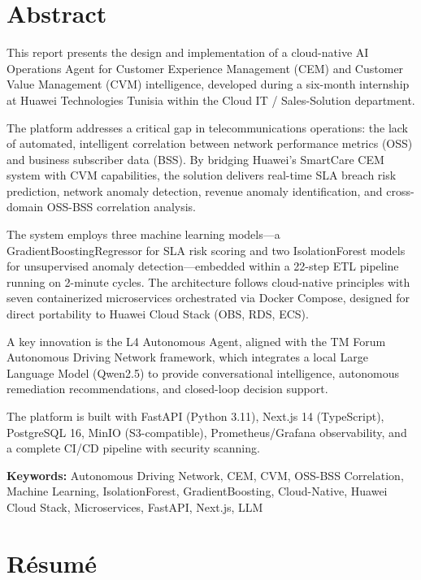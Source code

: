 \chapter*{Abstract}

This report presents the design and implementation of a cloud-native AI Operations Agent for Customer Experience Management (CEM) and Customer Value Management (CVM) intelligence, developed during a six-month internship at Huawei Technologies Tunisia within the Cloud IT / Sales-Solution department.

The platform addresses a critical gap in telecommunications operations: the lack of automated, intelligent correlation between network performance metrics (OSS) and business subscriber data (BSS). By bridging Huawei's SmartCare CEM system with CVM capabilities, the solution delivers real-time SLA breach risk prediction, network anomaly detection, revenue anomaly identification, and cross-domain OSS-BSS correlation analysis.

The system employs three machine learning models---a GradientBoostingRegressor for SLA risk scoring and two IsolationForest models for unsupervised anomaly detection---embedded within a 22-step ETL pipeline running on 2-minute cycles. The architecture follows cloud-native principles with seven containerized microservices orchestrated via Docker Compose, designed for direct portability to Huawei Cloud Stack (OBS, RDS, ECS).

A key innovation is the L4 Autonomous Agent, aligned with the TM Forum Autonomous Driving Network framework, which integrates a local Large Language Model (Qwen2.5) to provide conversational intelligence, autonomous remediation recommendations, and closed-loop decision support.

The platform is built with FastAPI (Python 3.11), Next.js 14 (TypeScript), PostgreSQL 16, MinIO (S3-compatible), Prometheus/Grafana observability, and a complete CI/CD pipeline with security scanning.

\textbf{Keywords:} Autonomous Driving Network, CEM, CVM, OSS-BSS Correlation, Machine Learning, IsolationForest, GradientBoosting, Cloud-Native, Huawei Cloud Stack, Microservices, FastAPI, Next.js, LLM

\vspace{1cm}

\chapter*{R\'esum\'e}

